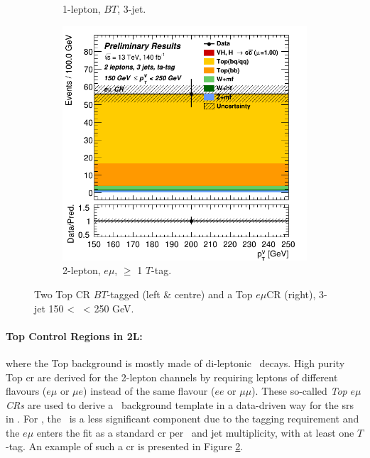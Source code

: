 \begin{figure}[h!]
\begin{subfigure}[b]{0.32\textwidth}
      \caption{1-lepton, $BT$, 3-jet.}
      \label{fig:plots_VHcc_ex_1L_TopCR}
  \end{subfigure}
  \begin{subfigure}[b]{0.32\textwidth}
    \centering
    \includegraphics[width=\textwidth]{Images/VH/Own_fit/prefit_VHcc/Region_distpTV_BMax250_BMin150_Dtopemucr_J3_TTypeta_T2_L2_Y6051_Prefit.png}
    \caption{2-lepton, $e\mu$, $\geq$ 1 $T$-tag.}
    \label{fig:plots_VHcc_ex_2L_TopCR}
\end{subfigure}
  \caption{Two Top CR $BT$-tagged (left \& centre) and a Top $e\mu$CR (right), 3-jet 150 < \ptv\ < 250 GeV.}
  \label{fig:plots_VHcc_ex_TopCR}
\end{figure} 

\paragraph{Top Control Regions in 2L:} where the Top background is mostly made of di-leptonic \ttb\ decays. High purity Top \gls{cr} are derived for the 2-lepton channels by requiring leptons of different flavours ($e\mu$ or $\mu e$) instead of the same flavour ($ee$ or $\mu\mu$). These so-called \textit{Top} $e\mu$ \textit{CRs} are used to derive a \ttb\ background template in a data-driven way for the \gls{sr}s in \vhb. For \vhc, the \ttb\ is a less significant component due to the tagging requirement and the $e\mu$ enters the fit as a standard \gls{cr} per \ptv\ and jet multiplicity, with at least one $T$-tag. An example of such a \gls{cr} is presented in Figure \ref{fig:plots_VHcc_ex_2L_TopCR}.

